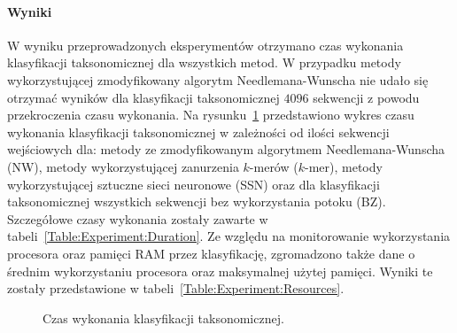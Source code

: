             \paragraph{Wyniki}
                W wyniku przeprowadzonych eksperymentów otrzymano czas wykonania klasyfikacji taksonomicznej dla wszystkich metod. W przypadku metody wykorzystującej zmodyfikowany algorytm Needlemana-Wunscha nie udało się otrzymać wyników dla klasyfikacji taksonomicznej $4096$ sekwencji z powodu przekroczenia czasu wykonania. Na rysunku~\ref{Picture:Experiment:Duration} przedstawiono wykres czasu wykonania klasyfikacji taksonomicznej w zależności od ilości sekwencji wejściowych dla: metody ze zmodyfikowanym algorytmem Needlemana-Wunscha (NW), metody wykorzystującej zanurzenia $k$-merów ($k$-mer), metody wykorzystującej sztuczne sieci neuronowe (SSN) oraz dla klasyfikacji taksonomicznej wszystkich sekwencji bez wykorzystania potoku (BZ). Szczegółowe czasy wykonania zostały zawarte w tabeli~\ref{Table:Experiment:Duration}. Ze względu na monitorowanie wykorzystania procesora oraz pamięci RAM przez klasyfikację, zgromadzono także dane o średnim wykorzystaniu procesora oraz maksymalnej użytej pamięci. Wyniki te zostały przedstawione w tabeli~\ref{Table:Experiment:Resources}.

                \begin{figure}
                    \begin{center}
                        
                    \end{center}
                    \caption{
                        Czas wykonania klasyfikacji taksonomicznej.
                    }\label{Picture:Experiment:Duration}
                \end{figure}

